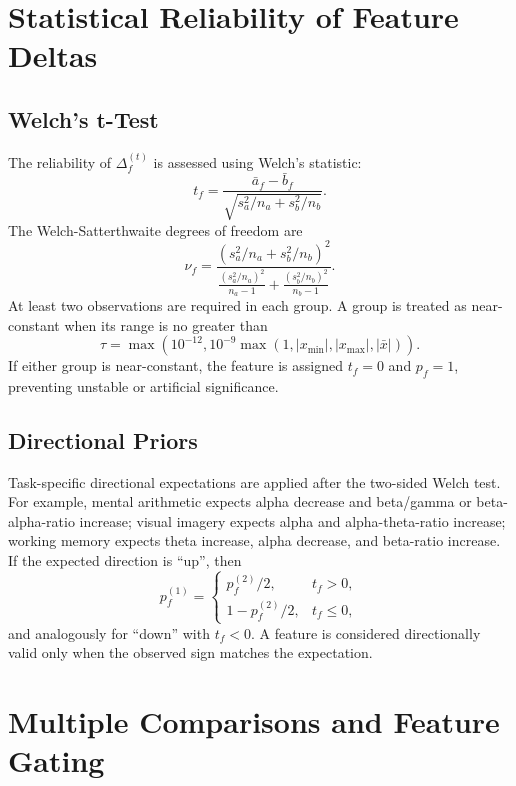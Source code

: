 \documentclass[conference]{IEEEtran}
\begin{document}
\section{Statistical Reliability of Feature Deltas}
\subsection{Welch's t-Test}
The reliability of $\Delta_f^{(t)}$ is assessed using Welch's statistic:
\begin{equation}
t_f=\frac{\bar{a}_f-\bar{b}_f}{\sqrt{s_a^2/n_a+s_b^2/n_b}}.
\end{equation}
The Welch-Satterthwaite degrees of freedom are
\begin{equation}
\nu_f=\frac{(s_a^2/n_a+s_b^2/n_b)^2}
{\frac{(s_a^2/n_a)^2}{n_a-1}+\frac{(s_b^2/n_b)^2}{n_b-1}}.
\end{equation}
At least two observations are required in each group. A group is treated as near-constant when its range is no greater than
\begin{equation}
\tau=\max\left(10^{-12},10^{-9}\max(1,|x_{\min}|,|x_{\max}|,|\bar{x}|)\right).
\end{equation}
If either group is near-constant, the feature is assigned $t_f=0$ and $p_f=1$, preventing unstable or artificial significance.

\subsection{Directional Priors}
Task-specific directional expectations are applied after the two-sided Welch test. For example, mental arithmetic expects alpha decrease and beta/gamma or beta-alpha-ratio increase; visual imagery expects alpha and alpha-theta-ratio increase; working memory expects theta increase, alpha decrease, and beta-ratio increase. If the expected direction is ``up'', then
\begin{equation}
p_f^{(1)}=
\begin{cases}
p_f^{(2)}/2, & t_f>0,\\
1-p_f^{(2)}/2, & t_f\le 0,
\end{cases}
\end{equation}
and analogously for ``down'' with $t_f<0$. A feature is considered directionally valid only when the observed sign matches the expectation.

\section{Multiple Comparisons and Feature Gating}
\end{document}
